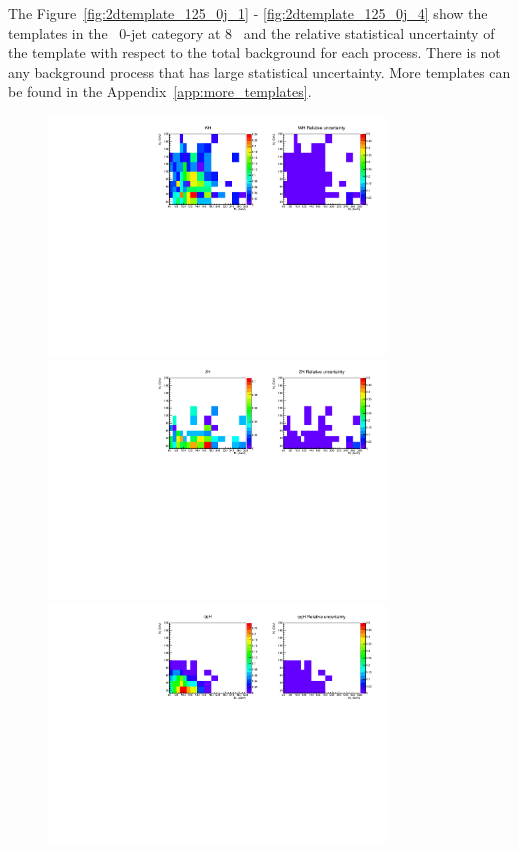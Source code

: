 The Figure~\ref{fig:2dtemplate_125_0j_1} - \ref{fig:2dtemplate_125_0j_4} show the templates 
in the \DF\ 0-jet category at 8 \TeV\
and the relative statistical uncertainty of the template with respect to the total background 
for each process. 
There is not any background process that has large statistical uncertainty.
More templates can be found in the Appendix~\ref{app:more_templates}.

\begin{figure}[htp]
\centering
\includegraphics[width=0.8\textwidth]{figures/2dtemplate_WH_mH125_0j.pdf}
\includegraphics[width=0.8\textwidth]{figures/2dtemplate_ZH_mH125_0j.pdf}
\includegraphics[width=0.8\textwidth]{figures/2dtemplate_qqH_mH125_0j.pdf}

\end{figure}

